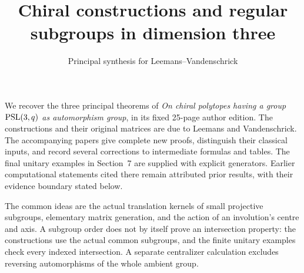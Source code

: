 \documentclass[11pt]{article}
\title{Chiral constructions and regular subgroups in dimension three}
\author{Principal synthesis for Leemans--Vandenschrick}\date{}
\begin{document}
\maketitle
We recover the three principal theorems of \emph{On chiral polytopes
having a group $\operatorname{PSL}(3,q)$ as automorphism group}, in its fixed
25-page author edition. The constructions and their original matrices
are due to Leemans and Vandenschrick. The accompanying papers give
complete new proofs, distinguish their classical inputs, and record
several corrections to intermediate formulas and tables. The final
unitary examples in Section~7 are supplied with explicit generators.
Earlier computational statements cited there remain attributed prior
results, with their evidence boundary stated below.

The common ideas are the actual translation kernels of small projective
subgroups, elementary matrix generation, and the action of an
involution's centre and axis. A subgroup order does not by itself prove
an intersection property: the constructions use the actual common
subgroups, and the finite unitary examples check every indexed
intersection. A separate centralizer calculation excludes reversing
automorphisms of the whole ambient group.
\end{document}
